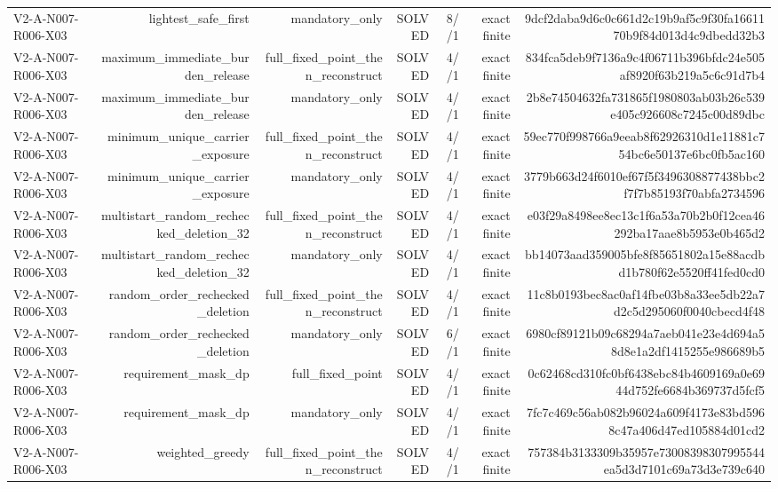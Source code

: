 {\begin{longtable}{lrrrrrr}
V2-A-N007-R006-X03 & lightest\_safe\_first & mandatory\_only & SOLVED & 8//1 & exact finite & 9dcf2daba9d6c0c661d2c19b9af5c9f30fa1661170b9f84d013d4c9dbedd32b3 \\
V2-A-N007-R006-X03 & maximum\_immediate\_burden\_release & full\_fixed\_point\_then\_reconstruct & SOLVED & 4//1 & exact finite & 834fca5deb9f7136a9c4f06711b396bfdc24e505af8920f63b219a5c6c91d7b4 \\
V2-A-N007-R006-X03 & maximum\_immediate\_burden\_release & mandatory\_only & SOLVED & 4//1 & exact finite & 2b8e74504632fa731865f1980803ab03b26c539e405c926608c7245c00d89dbc \\
V2-A-N007-R006-X03 & minimum\_unique\_carrier\_exposure & full\_fixed\_point\_then\_reconstruct & SOLVED & 4//1 & exact finite & 59ec770f998766a9eeab8f62926310d1e11881c754bc6e50137e6bc0fb5ac160 \\
V2-A-N007-R006-X03 & minimum\_unique\_carrier\_exposure & mandatory\_only & SOLVED & 4//1 & exact finite & 3779b663d24f6010ef67f5f3496308877438bbc2f7f7b85193f70abfa2734596 \\
V2-A-N007-R006-X03 & multistart\_random\_rechecked\_deletion\_32 & full\_fixed\_point\_then\_reconstruct & SOLVED & 4//1 & exact finite & e03f29a8498ee8ec13c1f6a53a70b2b0f12cea46292ba17aae8b5953e0b465d2 \\
V2-A-N007-R006-X03 & multistart\_random\_rechecked\_deletion\_32 & mandatory\_only & SOLVED & 4//1 & exact finite & bb14073aad359005bfe8f85651802a15e88acdbd1b780f62e5520ff41fed0cd0 \\
V2-A-N007-R006-X03 & random\_order\_rechecked\_deletion & full\_fixed\_point\_then\_reconstruct & SOLVED & 4//1 & exact finite & 11c8b0193bec8ac0af14fbe03b8a33ee5db22a7d2c5d295060f0040cbecd4f48 \\
V2-A-N007-R006-X03 & random\_order\_rechecked\_deletion & mandatory\_only & SOLVED & 6//1 & exact finite & 6980cf89121b09c68294a7aeb041e23e4d694a58d8e1a2df1415255e986689b5 \\
V2-A-N007-R006-X03 & requirement\_mask\_dp & full\_fixed\_point & SOLVED & 4//1 & exact finite & 0c62468cd310fc0bf6438ebc84b4609169a0e6944d752fe6684b369737d5fcf5 \\
V2-A-N007-R006-X03 & requirement\_mask\_dp & mandatory\_only & SOLVED & 4//1 & exact finite & 7fc7c469c56ab082b96024a609f4173e83bd5968c47a406d47ed105884d01cd2 \\
V2-A-N007-R006-X03 & weighted\_greedy & full\_fixed\_point\_then\_reconstruct & SOLVED & 4//1 & exact finite & 757384b3133309b35957e73008398307995544ea5d3d7101c69a73d3e739c640 \\

\end{longtable}}
